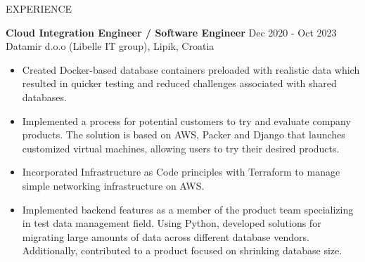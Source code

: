 \documentclass{resume} %
\begin{document}
\begin{rSection}{EXPERIENCE}

\textbf{Cloud Integration Engineer / Software Engineer} \hfill Dec 2020 - Oct 2023\\
Datamir d.o.o (Libelle IT group), Lipik, Croatia \hfill
 \begin{itemize}
    \itemsep -3pt {} 
     \item Created Docker-based database containers preloaded with realistic data which resulted in quicker testing and reduced challenges associated with shared databases.
    \item Implemented a process for potential customers to try and evaluate company products. The solution is based on AWS, Packer and Django that launches customized virtual machines, allowing users to try their desired products.   
    \item Incorporated Infrastructure as Code principles with Terraform to manage simple networking infrastructure on AWS.
    \item Implemented backend features as a member of the product team specializing in test data management field. Using Python, developed solutions for migrating large amounts of data across different database vendors. Additionally, contributed to a product focused on shrinking database size.
 \end{itemize}
 
\end{rSection} 

\end{document}
